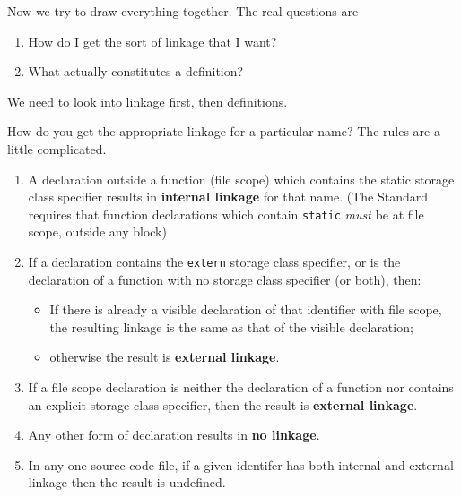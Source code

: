    Now we try to draw everything together. The real questions are


   \begin{enumerate}
    \item How do I get the sort of linkage that I want?
    \item What actually constitutes a definition?
   \end{enumerate}

   We need to look into linkage first, then definitions.


   How do you get the appropriate linkage for a particular name? The
    rules are a little complicated.


   \begin{enumerate}
    \item A declaration outside a function (file scope) which contains the
     static storage class specifier results in \textbf{internal linkage}
     for that name. (The Standard requires that function declarations which
     contain \texttt{static} \textit{must} be at file scope, outside any
     block)

    \item If a declaration contains the \texttt{extern} storage class
     specifier, or is the declaration of a function with no storage class
     specifier (or both), then:

     \begin{itemize}
      \item If there is already a visible declaration of that identifier
       with file scope, the resulting linkage is the same as that of
       the visible declaration;

      \item otherwise the result is \textbf{external linkage}.
     \end{itemize}
    

    \item If a file scope declaration is neither the declaration of a
     function nor contains an explicit storage class specifier, then the
     result is \textbf{external linkage}.

    \item Any other form of declaration results in \textbf{no linkage}.

    \item In any one source code file, if a given identifer has both internal
     and external linkage then the result is undefined.
   \end{enumerate}

